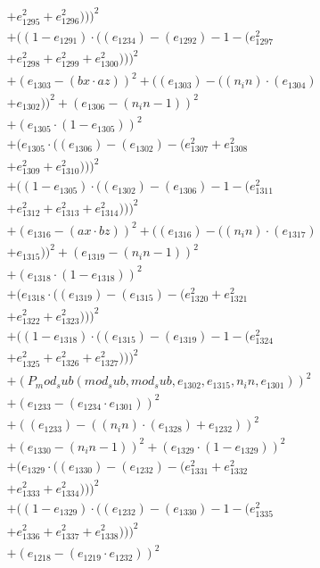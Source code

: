 \documentclass[10pt, a4paper]{article}
\begin{document}
\begin{align*}
& + e_{1295}^{2} + e_{1296}^{2})))^{2} \\
& + ((1 - e_{1291})  \cdot  ((e_{1234}) - (e_{1292}) - 1 - (e_{1297}^{2} \\
& + e_{1298}^{2} + e_{1299}^{2} + e_{1300}^{2})))^{2} \\
& + (e_{1303} - (bx  \cdot  az))^{2} + ((e_{1303}) - ((n_in)  \cdot  (e_{1304}) \\
& + e_{1302}))^{2} + (e_{1306} - (n_in - 1))^{2} \\
& + (e_{1305}  \cdot  (1 - e_{1305}))^{2} \\
& + (e_{1305}  \cdot  ((e_{1306}) - (e_{1302}) - (e_{1307}^{2} + e_{1308}^{2} \\
& + e_{1309}^{2} + e_{1310}^{2})))^{2} \\
& + ((1 - e_{1305})  \cdot  ((e_{1302}) - (e_{1306}) - 1 - (e_{1311}^{2} \\
& + e_{1312}^{2} + e_{1313}^{2} + e_{1314}^{2})))^{2} \\
& + (e_{1316} - (ax  \cdot  bz))^{2} + ((e_{1316}) - ((n_in)  \cdot  (e_{1317}) \\
& + e_{1315}))^{2} + (e_{1319} - (n_in - 1))^{2} \\
& + (e_{1318}  \cdot  (1 - e_{1318}))^{2} \\
& + (e_{1318}  \cdot  ((e_{1319}) - (e_{1315}) - (e_{1320}^{2} + e_{1321}^{2} \\
& + e_{1322}^{2} + e_{1323}^{2})))^{2} \\
& + ((1 - e_{1318})  \cdot  ((e_{1315}) - (e_{1319}) - 1 - (e_{1324}^{2} \\
& + e_{1325}^{2} + e_{1326}^{2} + e_{1327}^{2})))^{2} \\
& + (P_mod_sub(mod_sub, mod_sub, e_{1302}, e_{1315}, n_in, e_{1301}))^{2} \\
& + (e_{1233} - (e_{1234}  \cdot  e_{1301}))^{2} \\
& + ((e_{1233}) - ((n_in)  \cdot  (e_{1328}) + e_{1232}))^{2} \\
& + (e_{1330} - (n_in - 1))^{2} + (e_{1329}  \cdot  (1 - e_{1329}))^{2} \\
& + (e_{1329}  \cdot  ((e_{1330}) - (e_{1232}) - (e_{1331}^{2} + e_{1332}^{2} \\
& + e_{1333}^{2} + e_{1334}^{2})))^{2} \\
& + ((1 - e_{1329})  \cdot  ((e_{1232}) - (e_{1330}) - 1 - (e_{1335}^{2} \\
& + e_{1336}^{2} + e_{1337}^{2} + e_{1338}^{2})))^{2} \\
& + (e_{1218} - (e_{1219}  \cdot  e_{1232}))^{2} \\

\end{align*}
\end{document}
